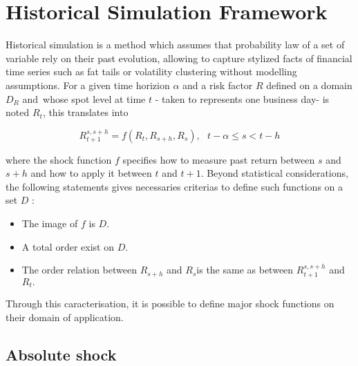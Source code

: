 \documentclass[3pt]{article}
\begin{document}
\bigskip

\bigskip

\bigskip

\bigskip

\bigskip

\bigskip

\bigskip

\bigskip

\section{Historical Simulation Framework}

Historical simulation is a method which assumes that probability law of a
set of variable rely on their past evolution, allowing to capture stylized
facts of financial time series such as fat tails or volatility clustering
without modelling assumptions. For a given time horizion $\alpha $ and a
risk factor $R$ defined on a domain $D_{R}$ and\ whose spot level at time $t$
- taken to represents one business day- is noted $R_{t}$, this translates
into

\begin{equation*}
R_{t+1}^{s,s+h}=f(R_{t},R_{s+h},R_{s}),\text{ \ \ }t-\alpha \leq s<t-h
\end{equation*}

where the shock function $f$ specifies how to measure past return between $s$
and $s+h$ and how to apply it between $t$ and $t+1$. Beyond statistical
considerations, the following statements gives necessaries criterias to
define such functions on a set $D$ :

\bigskip

\begin{itemize}
\item The image of $f$ is $D.$

\item A total order exist on $D.$

\item The order relation between $R_{s+h}$ and $R_{s}$is the same as between 
$R_{t+1}^{s,s+h}$ and $R_{t}.$
\end{itemize}

\bigskip 

Through this caracterisation, it is possible to define major shock functions
on their domain of application.

\subsection{Absolute shock}
\end{document}
